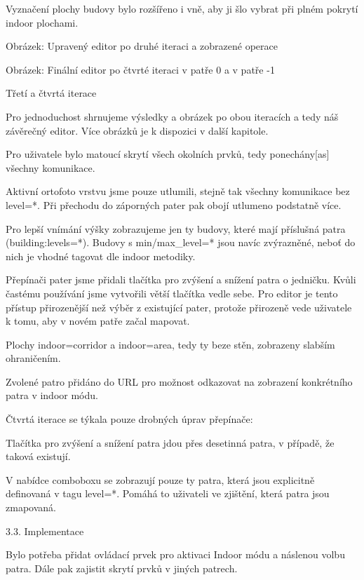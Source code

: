 Vyznačení plochy budovy bylo rozšířeno i vně, aby ji šlo vybrat při plném pokrytí indoor plochami.



Obrázek: Upravený editor po druhé iteraci a zobrazené operace





Obrázek: Finální editor po čtvrté iteraci v patře 0 a v patře -1

Třetí a čtvrtá iterace



Pro jednoduchost shrnujeme výsledky a obrázek po obou iteracích a tedy náš závěrečný editor. Více obrázků je k dispozici v další kapitole.

Pro uživatele bylo matoucí skrytí všech okolních prvků, tedy ponechány[as] všechny komunikace.

Aktivní ortofoto vrstvu jsme pouze utlumili, stejně tak všechny komunikace bez level=*. Při přechodu do záporných pater pak obojí utlumeno podstatně více.

Pro lepší vnímání výšky zobrazujeme jen ty budovy, které mají příslušná patra (building:levels=*). Budovy s min/max\_level=* jsou navíc zvýrazněné, neboť do nich je vhodné tagovat dle indoor metodiky.

Přepínači pater jsme přidali tlačítka pro zvýšení a snížení patra o jedničku. Kvůli častému používání jsme vytvořili větší tlačítka vedle sebe. Pro editor je tento přístup přirozenější než výběr z existující pater, protože přirozeně vede uživatele k tomu, aby v novém patře začal mapovat.

Plochy indoor=corridor a indoor=area, tedy ty beze stěn, zobrazeny slabším ohraničením.

Zvolené patro přidáno do URL pro možnost odkazovat na zobrazení konkrétního patra v indoor módu.

Čtvrtá iterace se týkala pouze drobných úprav přepínače:

Tlačítka pro zvýšení a snížení patra jdou přes desetinná patra, v případě, že taková existují.

 V nabídce comboboxu se zobrazují pouze ty patra, která jsou explicitně definovaná v tagu level=*. Pomáhá to uživateli ve zjištění, která patra jsou zmapovaná.

3.3. Implementace



Bylo potřeba přidat ovládací prvek pro aktivaci Indoor módu a náslenou volbu patra. Dále pak zajistit skrytí prvků v jiných patrech.

